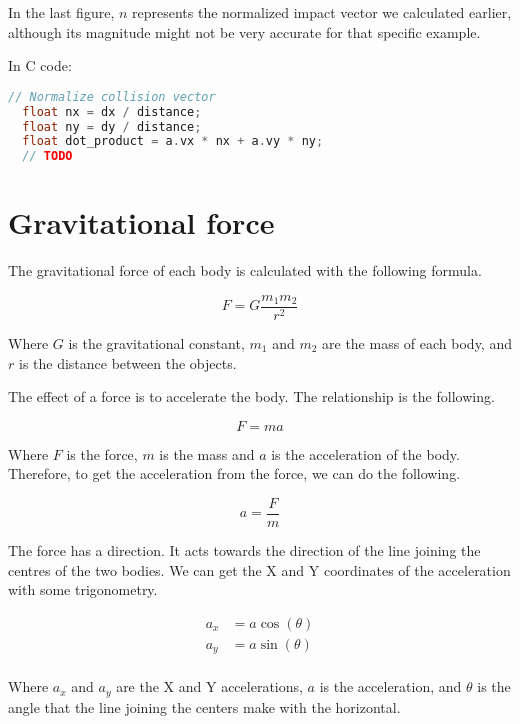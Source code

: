 \documentclass{amsart}
\begin{document}
In the last figure, $n$ represents the normalized impact vector we calculated
earlier, although its magnitude might not be very accurate for that specific
example.

\bigskip

In C code:

\begin{lstlisting}[language=C]
  // Normalize collision vector
  float nx = dx / distance;
  float ny = dy / distance;
  float dot_product = a.vx * nx + a.vy * ny;
  // TODO
\end{lstlisting}

\newpage

\section{Gravitational force}

The gravitational force of each body is calculated with the following formula.

\begin{displaymath}
  F = G \frac{m_1m_2}{r^2}
\end{displaymath}

Where $G$ is the gravitational constant, $m_1$ and $m_2$ are the mass of each
body, and $r$ is the distance between the objects.

The effect of a force is to accelerate the body. The relationship is the
following.

\begin{displaymath}
  F = m a
\end{displaymath}

Where $F$ is the force, $m$ is the mass and $a$ is the acceleration of the
body. Therefore, to get the acceleration from the force, we can do the
following.

\begin{displaymath}
  a = \frac{F}{m}
\end{displaymath}

The force has a direction. It acts towards the direction of the line joining
the centres of the two bodies. We can get the X and Y coordinates of the
acceleration with some trigonometry.

\begin{align*}
  a_x &= a \cos(\theta) \\
  a_y &= a \sin(\theta) \\
\end{align*}

Where $a_x$ and $a_y$ are the X and Y accelerations, $a$ is the acceleration,
and $\theta$ is the angle that the line joining the centers make with the
horizontal.
\end{document}
